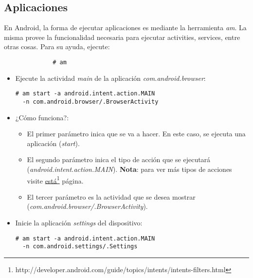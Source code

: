 \subsection{Aplicaciones}
En Android, la forma de ejecutar aplicaciones es mediante la herramienta \textit{am}. La misma provee la funcionalidad necesaria para ejecutar activities, services, entre otras cosas.
Para su ayuda, ejecute:
\begin{lstlisting}
		      # am
\end{lstlisting}

\begin{itemize}
    \item Ejecute la actividad \textit{main} de la aplicación \emph{com.android.browser}:
    \begin{lstlisting}
# am start -a android.intent.action.MAIN 
  -n com.android.browser/.BrowserActivity
    \end{lstlisting}
    \item ¿Cómo funciona?:
    \begin{itemize}
	\item El primer parámetro inica que se va a hacer. En este caso, se ejecuta una aplicación (\emph{start}).
	
	\item El segundo parámetro inica el tipo de acción que se ejecutará (\emph{android.intent.action.MAIN}). \textbf{Nota}: para ver más tipos de acciones visite \href{http://developer.android.com/guide/topics/intents/intents-filters.html}{está}\footnote{http://developer.android.com/guide/topics/intents/intents-filters.html} página.
	
	\item El tercer parámetro es la actividad que se desea mostrar 
	(\emph{com.android.browser/.BrowserActivity}).
    \end{itemize}

    \item Inicie la aplicación \emph{settings} del dispositivo:
    \begin{lstlisting}
# am start -a android.intent.action.MAIN 
  -n com.android.settings/.Settings
    \end{lstlisting}
\end{itemize}

